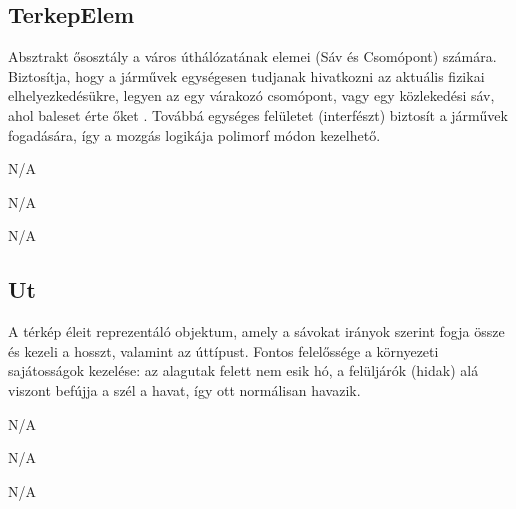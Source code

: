 \subsection{TerkepElem}
\begin{class-template-responsibility}
  Absztrakt ősosztály a város úthálózatának elemei (Sáv és Csomópont) számára. Biztosítja, hogy a járművek egységesen tudjanak hivatkozni az aktuális fizikai elhelyezkedésükre, legyen az egy várakozó csomópont, vagy egy közlekedési sáv, ahol baleset érte őket . Továbbá egységes felületet (interfészt) biztosít a járművek fogadására, így a mozgás logikája polimorf módon kezelhető.
\end{class-template-responsibility}
\begin{class-template-baseclass}
    N/A
\end{class-template-baseclass}
\begin{class-template-interface}
    N/A
\end{class-template-interface}
\begin{class-template-attribute}
    N/A
\end{class-template-attribute}
\begin{class-template-method}
\end{class-template-method}

\subsection{Ut}
\begin{class-template-responsibility}
    A térkép éleit reprezentáló objektum, amely a sávokat irányok szerint fogja össze és kezeli a hosszt, valamint az úttípust. Fontos felelőssége a környezeti sajátosságok kezelése: az alagutak felett nem esik hó, a felüljárók (hidak) alá viszont befújja a szél a havat, így ott normálisan havazik.
\end{class-template-responsibility}
\begin{class-template-baseclass}
    N/A
\end{class-template-baseclass}
\begin{class-template-interface}
    N/A
\end{class-template-interface}
\begin{class-template-attribute}
\end{class-template-attribute}
\begin{class-template-method}
    N/A
\end{class-template-method}

